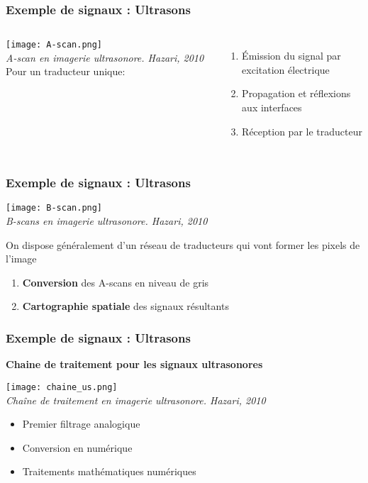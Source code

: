 \documentclass{beamer}
\begin{document}
\begin{frame}
\frametitle{Exemple de signaux : Ultrasons}
\begin{columns}
\column{60mm}
\texttt{[image: A-scan.png]}\\
\textit{\footnotesize A-scan en imagerie ultrasonore. Hazari, 2010}
\column{60mm}
Pour un traducteur unique:
\vspace{0.2cm}
\begin{enumerate}
\item<2-> \'Emission du signal par excitation électrique
\vspace{0.2cm}
\item<3-> Propagation et réflexions aux interfaces 
\vspace{0.2cm}
\item<4-> Réception par le traducteur
\end{enumerate}
\vspace{0.2cm}
\end{columns}
\end{frame}

\begin{frame}
\frametitle{Exemple de signaux : Ultrasons}
\begin{center}
\texttt{[image: B-scan.png]}\\
\textit{\footnotesize B-scans en imagerie ultrasonore. Hazari, 2010}\\
\end{center}
On dispose généralement d'un réseau de traducteurs qui vont former les pixels de l'image\\
\vspace{0.2cm}
\begin{enumerate}
\item<2-> \textbf{Conversion} des A-scans en niveau de gris
\vspace{0.2cm}
\item<3-> \textbf{Cartographie spatiale} des signaux résultants 
\end{enumerate}
\vspace{0.2cm}

\end{frame}

\begin{frame}
\frametitle{Exemple de signaux : Ultrasons}
\textbf{Chaine de traitement pour les signaux ultrasonores}\\
\begin{center}
\texttt{[image: chaine\_us.png]}\\
\textit{\footnotesize Chaîne de traitement en imagerie ultrasonore. Hazari, 2010}\\
\end{center}
\begin{itemize}
\item<2-> Premier filtrage analogique 
\item<3-> Conversion en numérique
\item<4-> Traitements mathématiques numériques 
\end{itemize}
\end{frame}
\end{document}
